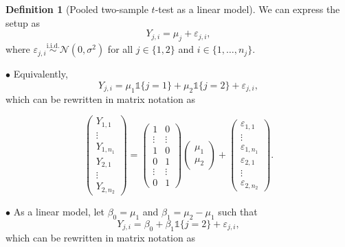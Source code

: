 \documentclass[12pt,oneside]{article}
\newcommand{\N}{\mathcal{N}}
\newcommand{\simiid}{\overset{\text{i.i.d.}}{\sim}}
\newcommand{\indic}{\mathds{1}}
\theoremstyle{definition}
\newtheorem{definition}{Definition}
\theoremstyle{remark}
\begin{document}
\begin{definition}[Pooled two-sample $t$-test as a linear model]
We can express the setup as \[Y_{j, i} = \mu_{j} + \varepsilon_{j, i},\] where $\varepsilon_{j, i} \simiid \N(0, \sigma^2)$ for all $j \in \{1, 2\}$ and $i \in \{1, \ldots, n_j\}$.

$\bullet$ Equivalently, \[Y_{j, i} = \mu_{1} \indic\{\text{$j = 1$}\} + \mu_{2} \indic\{\text{$j = 2$}\} + \varepsilon_{j, i},\] which can be rewritten in matrix notation as

\[
\begin{pmatrix}
Y_{1, 1} \\
\vdots \\
Y_{1, n_1} \\
Y_{2, 1} \\
\vdots \\
Y_{2, n_2}
\end{pmatrix}
=
\begin{pmatrix}
1 & 0 \\
\vdots & \vdots \\
1 & 0 \\
0 & 1 \\
\vdots & \vdots \\
0 & 1
\end{pmatrix}
\begin{pmatrix}
\mu_{1} \\
\mu_{2}
\end{pmatrix}
+
\begin{pmatrix}
\varepsilon_{1, 1} \\
\vdots \\
\varepsilon_{1, n_1} \\
\varepsilon_{2, 1} \\
\vdots \\
\varepsilon_{2, n_2}
\end{pmatrix}.
\]

$\bullet$ As a linear model, let $\beta_0 = \mu_1$ and $\beta_1 = \mu_2 - \mu_1$ such that \[Y_{j, i} = \beta_{0} + \beta_{1} \indic\{\text{$j = 2$}\} + \varepsilon_{j, i},\] which can be rewritten in matrix notation as


\end{definition}
\end{document}
